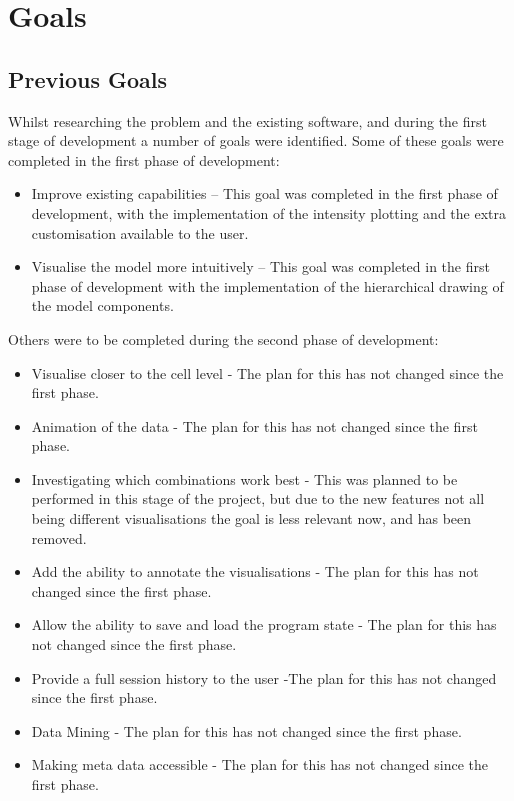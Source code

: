 \section{Goals}

\subsection{Previous Goals}
Whilst researching the problem and the existing software, and during the first stage of development a number of goals were identified.  Some of these goals were completed in the first phase of development:

\begin{itemize}
\item Improve existing capabilities -- This goal was completed in the first phase of development, with the implementation of the intensity plotting and the extra customisation available to the user.
\item Visualise the model more intuitively -- This goal was completed in the first phase of development with the implementation of the hierarchical drawing of the model components.
\end{itemize}

Others were to be completed during the second phase of development:

\begin{itemize}
\item Visualise closer to the cell level - The plan for this has not changed since the first phase.
\item Animation of the data - The plan for this has not changed since the first phase.
\item Investigating which combinations work best - This was planned to be performed in this stage of the project, but due to the new features not all being different visualisations the goal is less relevant now, and has been removed.
\item Add the ability to annotate the visualisations - The plan for this has not changed since the first phase.
\item Allow the ability to save and load the program state - The plan for this has not changed since the first phase.
\item Provide a full session history to the user -The plan for this has not changed since the first phase.
\item Data Mining - The plan for this has not changed since the first phase.
\item Making meta data accessible - The plan for this has not changed since the first phase.
\end{itemize}

